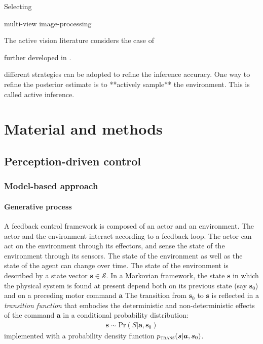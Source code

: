 \documentclass[12pt,twoside,openright]{article}
\begin{document}
Selecting 

multi-view image-processing

The active vision literature considers the case of 




further developed in \cite{najemnik2005optimal,butko2010infomax,ahmad2013active,potthast2016active}.



{ different strategies can be adopted to refine the inference accuracy. One way to refine the posterior estimate is to **actively sample** the environment. This is called active inference.} 



\section{Material and methods}

\subsection{Perception-driven control}\label{sec:perception-driven-control}






\subsubsection{Model-based approach}
\paragraph{Generative process}
A feedback control framework is composed of an actor and an environment. The actor and the environment interact according to a feedback loop. 
The actor can act on the environment through its effectors, and sense the state of the environment through its sensors. 
The state of the environment as well as the state of the agent can change over time. The state of the environment is described by a state vector $\boldsymbol{s} \in \mathcal{S}$.
In a Markovian framework, the state $\boldsymbol{s}$ in which the physical system is found at present depend both on its previous state (say $\boldsymbol{s}_0$) and on a preceding motor command $\boldsymbol{a}$ 
The transition from $\boldsymbol{s}_0$ to $\boldsymbol{s}$ is reflected in a \emph{transition function} that embodies the deterministic and non-deterministic effects of the command $\boldsymbol{a}$ in a conditional probability distribution:  
\begin{align}
\boldsymbol{s} \sim \text{Pr}(S|\boldsymbol{a},\boldsymbol{s}_0) \label{eq:process}
\end{align}
implemented with a probability density function 
$p_\text{\sc trans}(\boldsymbol{s}|\boldsymbol{a},\boldsymbol{s}_0)$.
\end{document}

